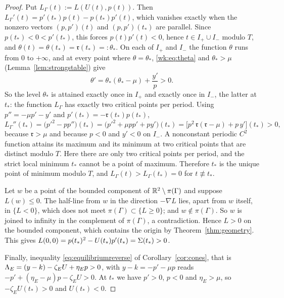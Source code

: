 \begin{proof}
Put $L_\Gamma(t):=L(U(t),p(t))$. Then $L_\Gamma'(t)=p'(t_\ast)p(t)-p(t_\ast)p'(t)$, which vanishes exactly when the nonzero vectors $(p,p')(t)$ and $(p,p')(t_\ast)$ are parallel. Since $p(t_\ast)<0<p'(t_\ast)$, this forces $p(t)p'(t)<0$, hence $t\in I_+\cup I_-$ modulo $T$, and $\theta(t)=\theta(t_\ast)=\mathfrak r(t_\ast)=:\theta_\ast$. On each of $I_+$ and $I_-$ the function $\theta$ runs from $0$ to $+\infty$, and at every point where $\theta=\theta_\ast$, \eqref{wk:eq:theta} and $\theta_\ast>\mu$ (Lemma~\ref{lem:strongstable}) give
\[
\theta'=\theta_\ast(\theta_\ast-\mu)+\frac{y'}{p}>0 .
\]
So the level $\theta_\ast$ is attained exactly once in $I_+$ and exactly once in $I_-$, the latter at $t_\ast$: the function $L_\Gamma$ has exactly two critical points per period. Using $p''=-\mu p'-y'$ and $p'(t_\ast)=-\mathfrak r(t_\ast)p(t_\ast)$,
\[
L_\Gamma''(t_\ast)=\bigl(p'^2-pp''\bigr)(t_\ast)=\bigl(p'^2+\mu pp'+py'\bigr)(t_\ast)=\bigl[p^2\,\mathfrak r(\mathfrak r-\mu)+p\,y'\bigr](t_\ast)>0,
\]
because $\mathfrak r>\mu$ and because $p<0$ and $y'<0$ on $I_-$. A nonconstant periodic $C^2$ function attains its maximum and its minimum at two critical points that are distinct modulo $T$. Here there are only two critical points per period, and the strict local minimum $t_\ast$ cannot be a point of maximum. Therefore $t_\ast$ is the unique point of minimum modulo $T$, and $L_\Gamma(t)>L_\Gamma(t_\ast)=0$ for $t\not\equiv t_\ast$.

Let $w$ be a point of the bounded component of $\mathbb R^2\setminus\pi(\Gamma)$ and suppose $L(w)\le0$. The half-line from $w$ in the direction $-\nabla L$ lies, apart from $w$ itself, in $\{L<0\}$, which does not meet $\pi(\Gamma)\subset\{L\ge0\}$; and $w\notin\pi(\Gamma)$. So $w$ is joined to infinity in the complement of $\pi(\Gamma)$, a contradiction. Hence $L>0$ on the bounded component, which contains the origin by Theorem~\ref{thm:geometry}. This gives $L(0,0)=p(t_\ast)^2-U(t_\ast)p'(t_\ast)=\Sigma(t_\ast)>0$.

Finally, inequality \eqref{eq:equilibriumreverse} of Corollary~\ref{cor:cones}, that is $\Lambda_E=(y-k)-\zeta_EU+\eta_Ep>0$, with $y-k=-p'-\mu p$ reads $-p'+(\eta_E-\mu)p-\zeta_EU>0$. At $t_\ast$ we have $p'>0$, $p<0$ and $\eta_E>\mu$, so $-\zeta_EU(t_\ast)>0$ and $U(t_\ast)<0$.
\end{proof}

